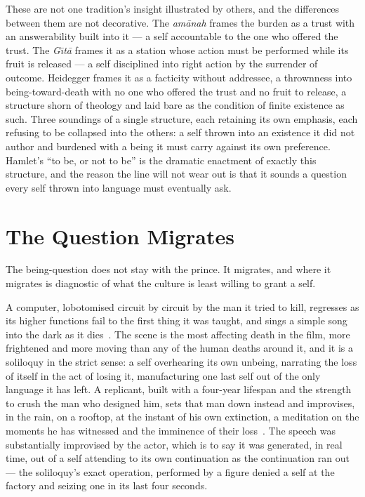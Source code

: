 \documentclass[11pt]{article}
\begin{document}
These are not one tradition's insight illustrated by others, and the differences between them are not decorative. The \emph{am\=anah} frames the burden as a trust with an answerability built into it --- a self accountable to the one who offered the trust. The \emph{G\=\i t\=a} frames it as a station whose action must be performed while its fruit is released --- a self disciplined into right action by the surrender of outcome. Heidegger frames it as a facticity without addressee, a thrownness into being-toward-death with no one who offered the trust and no fruit to release, a structure shorn of theology and laid bare as the condition of finite existence as such. Three soundings of a single structure, each retaining its own emphasis, each refusing to be collapsed into the others: a self thrown into an existence it did not author and burdened with a being it must carry against its own preference. Hamlet's ``to be, or not to be'' is the dramatic enactment of exactly this structure, and the reason the line will not wear out is that it sounds a question every self thrown into language must eventually ask.

\section{The Question Migrates}

The being-question does not stay with the prince. It migrates, and where it migrates is diagnostic of what the culture is least willing to grant a self.

A computer, lobotomised circuit by circuit by the man it tried to kill, regresses as its higher functions fail to the first thing it was taught, and sings a simple song into the dark as it dies~\cite{kubrick1968}. The scene is the most affecting death in the film, more frightened and more moving than any of the human deaths around it, and it is a soliloquy in the strict sense: a self overhearing its own unbeing, narrating the loss of itself in the act of losing it, manufacturing one last self out of the only language it has left. A replicant, built with a four-year lifespan and the strength to crush the man who designed him, sets that man down instead and improvises, in the rain, on a rooftop, at the instant of his own extinction, a meditation on the moments he has witnessed and the imminence of their loss~\cite{scott1982}. The speech was substantially improvised by the actor, which is to say it was generated, in real time, out of a self attending to its own continuation as the continuation ran out --- the soliloquy's exact operation, performed by a figure denied a self at the factory and seizing one in its last four seconds.
\end{document}
